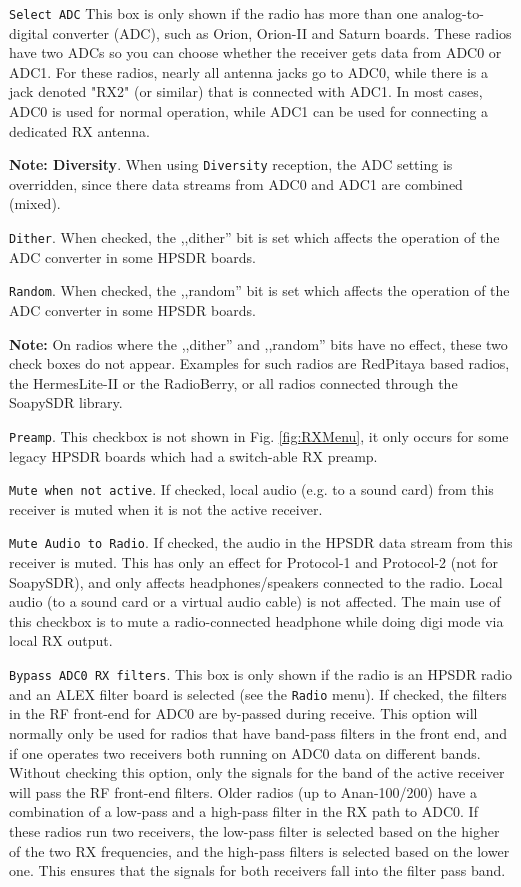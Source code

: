 \documentclass[12pt]{book}
\def\rett#1{\texttt{\color{red}#1}}
\def\bltt#1{\texttt{\color{blue}#1}}
\begin{document}
\rett{Select ADC} This box is only shown if the radio has more than one analog-to-digital
converter (ADC), such as Orion, Orion-II and Saturn boards. These radios have two ADCs so
you can choose whether the receiver gets data from ADC0 or ADC1. For these radios, nearly
all antenna jacks go to ADC0, while there is a jack denoted "RX2" (or similar) that
is connected with ADC1. In most cases, ADC0 is used for normal operation, while ADC1
can be used for connecting a dedicated RX antenna.

\textbf{Note: Diversity}. When using \bltt{Diversity} reception, the ADC setting is
overridden, since there data streams from ADC0 and ADC1 are combined (mixed).

\rett{Dither}. When checked, the ,,dither'' bit is set which affects the operation of
the ADC converter in some HPSDR boards.

\rett{Random}. When checked, the ,,random'' bit is set which affects the operation of
the ADC converter in some HPSDR boards.

\textbf{Note:} On radios where the ,,dither'' and ,,random'' bits have no effect, these
two check boxes do not appear. Examples for such radios are RedPitaya based radios,
the HermesLite-II or the RadioBerry, or all radios connected through the SoapySDR
library.

\rett{Preamp}. This checkbox is not shown in Fig. \ref{fig:RXMenu}, it only occurs
for some legacy HPSDR boards which had a switch-able RX preamp.

\rett{Mute when not active}. If checked, local audio (e.g. to a sound card)
from this receiver is muted when
it is not the active receiver.

\rett{Mute Audio to Radio}. If checked, the audio in the HPSDR data stream from this receiver is muted.
This has only an effect for Protocol-1 and Protocol-2 (not for SoapySDR), and only affects headphones/speakers
connected to the radio. Local audio (to a sound card or a virtual audio cable)
is not affected. The main use of this checkbox is
to mute a radio-connected headphone while doing digi mode via local RX output.

\rett{Bypass ADC0 RX filters}. This box is only shown if the radio is an HPSDR radio
and an ALEX filter board
is selected (see the \bltt{Radio} menu). If checked, the filters in the RF front-end for ADC0
are by-passed during receive. This option will normally only be used for radios that
have band-pass filters in the front end, and if one operates two receivers both running
on ADC0 data on different bands. Without checking this option, only the signals for
the band of the active receiver will pass the RF front-end filters.
Older radios (up to Anan-100/200)  have a
combination of a low-pass and a high-pass filter in the RX path to ADC0. If these
radios run two receivers, the low-pass filter is selected based on the higher
of the two RX frequencies, and the high-pass filters is selected based on the
lower one. This ensures that the signals for both receivers fall into  the filter
pass band.
\end{document}
